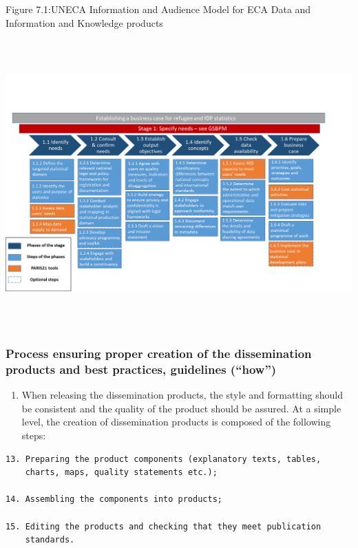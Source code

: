 \documentclass[
]{article}
\providecommand{\tightlist}{%
  \setlength{\itemsep}{0pt}\setlength{\parskip}{0pt}}
\begin{document}
Figure 7.1:UNECA Information and Audience Model for ECA Data and
Information and Knowledge products

\includegraphics[width=6.72317in,height=4.34651in]{media/image1.png}

\hypertarget{process-ensuring-proper-creation-of-the-dissemination-products-and-best-practices-guidelines-how}{%
\subsubsection{Process ensuring proper creation of the dissemination products and best practices, guidelines (``how'')}\label{process-ensuring-proper-creation-of-the-dissemination-products-and-best-practices-guidelines-how}}

\begin{enumerate}
\def\labelenumi{\arabic{enumi}.}
\setcounter{enumi}{518}
\tightlist
\item
  When releasing the dissemination products, the style and formatting
  should be consistent and the quality of the product should be
  assured. At a simple level, the creation of dissemination products
  is composed of the following steps:
\end{enumerate}

\begin{verbatim}
13. Preparing the product components (explanatory texts, tables,
    charts, maps, quality statements etc.);

14. Assembling the components into products;

15. Editing the products and checking that they meet publication
    standards.
\end{verbatim}
\end{document}
